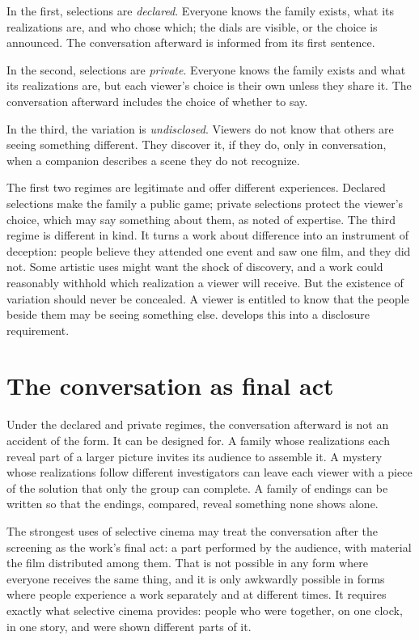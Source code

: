 In the first, selections are \emph{declared}. Everyone knows the family exists, what its realizations are, and who chose which; the dials are visible, or the choice is announced. The conversation afterward is informed from its first sentence.

In the second, selections are \emph{private}. Everyone knows the family exists and what its realizations are, but each viewer's choice is their own unless they share it. The conversation afterward includes the choice of whether to say.

In the third, the variation is \emph{undisclosed}. Viewers do not know that others are seeing something different. They discover it, if they do, only in conversation, when a companion describes a scene they do not recognize.

The first two regimes are legitimate and offer different experiences. Declared selections make the family a public game; private selections protect the viewer's choice, which may say something about them, as  noted of expertise. The third regime is different in kind. It turns a work about difference into an instrument of deception: people believe they attended one event and saw one film, and they did not. Some artistic uses might want the shock of discovery, and a work could reasonably withhold which realization a viewer will receive. But the existence of variation should never be concealed. A viewer is entitled to know that the people beside them may be seeing something else.  develops this into a disclosure requirement.

\section{The conversation as final act}

Under the declared and private regimes, the conversation afterward is not an accident of the form. It can be designed for. A family whose realizations each reveal part of a larger picture invites its audience to assemble it. A mystery whose realizations follow different investigators can leave each viewer with a piece of the solution that only the group can complete. A family of endings can be written so that the endings, compared, reveal something none shows alone.

The strongest uses of selective cinema may treat the conversation after the screening as the work's final act: a part performed by the audience, with material the film distributed among them. That is not possible in any form where everyone receives the same thing, and it is only awkwardly possible in forms where people experience a work separately and at different times. It requires exactly what selective cinema provides: people who were together, on one clock, in one story, and were shown different parts of it.


